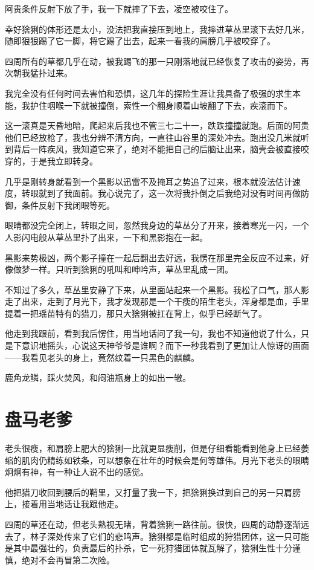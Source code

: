 阿贵条件反射下放了手，我一下就摔了下去，凌空被咬住了。

幸好猞猁的体形还是太小，没法把我直接压到地上，我摔进草丛里滚下去好几米，随即狠狠踢了它一脚，将它踢了出去，起来一看我的肩膀几乎被咬穿了。

四周所有的草都几乎在动，被我踢飞的那一只刚落地就已经恢复了攻击的姿势，再次朝我猛扑过来。

我完全没有任何时间去害怕和恐惧，这几年的探险生涯让我具备了极强的求生本能，我护住咽喉一下就被撞倒，索性一个翻身顺着山坡翻了下去，疾滚而下。

这一滚真是天昏地暗，爬起来后我也不管三七二十一，跌跌撞撞就跑。后面的阿贵他们已经放枪了，我也分辨不清方向，一直往山谷里的深处冲去。跑出没几米就听到背后一阵疾风，我知道它来了，绝对不能把自己的后脑让出来，脑壳会被直接咬穿的，于是我立即转身。

几乎是刚转身就看到一个黑影以迅雷不及掩耳之势追了过来，根本就没法估计速度，转眼就到了我面前。我心说完了，这一次将我扑倒之后我绝对没有时间再做防御，条件反射下我闭眼等死。

眼睛都没完全闭上，转眼之间，忽然我身边的草丛分了开来，接着寒光一闪，一个人影闪电般从草丛里扑了出来，一下和黑影抱在一起。

黑影来势极凶，两个影子撞在一起后翻出去好远，我愣在那里完全反应不过来，好像做梦一样。只听到猞猁的吼叫和呻吟声，草丛里乱成一团。

不知过了多久，草丛里安静了下来，从里面站起来一个黑影。我松了口气，那人影走了出来，走到了月光下，我才发现那是一个干瘦的陌生老头，浑身都是血，手里提着一把瑶苗特有的猎刀，那只大猞猁被扛在背上，似乎已经断气了。

他走到我跟前，看到我后愣住，用当地话问了我一句，我也不知道他说了什么，只是下意识地摇头，心说这天神爷爷是谁啊？而下一秒我看到了更加让人惊讶的画面——我看见老头的身上，竟然纹着一只黑色的麒麟。

鹿角龙鳞，踩火焚风，和闷油瓶身上的如出一辙。

\chapter{盘马老爹}

老头很瘦，和肩膀上肥大的猞猁一比就更显瘦削，但是仔细看能看到他身上已经萎缩的肌肉仍精练如铁条，可以想象在壮年的时候会是何等雄伟。月光下老头的眼睛炯炯有神，有一种让人说不出的感觉。

他把猎刀收回到腰后的鞘里，又打量了我一下，把猞猁换过到自己的另一只肩膀上，接着用当地话让我跟他走。

四周的草还在动，但老头熟视无睹，背着猞猁一路往前。很快，四周的动静逐渐远去了，林子深处传来了它们的悲鸣声。猞猁都是临时组成的狩猎团体，这一只可能是其中最强壮的，负责最后的扑杀，它一死狩猎团体就瓦解了，猞猁生性十分谨慎，绝对不会再冒第二次险。

